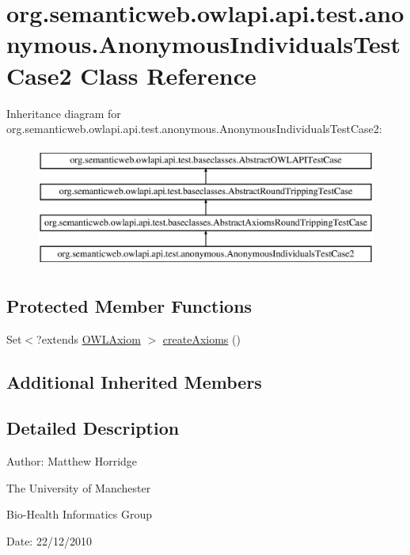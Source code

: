 \hypertarget{classorg_1_1semanticweb_1_1owlapi_1_1api_1_1test_1_1anonymous_1_1_anonymous_individuals_test_case2}{\section{org.\-semanticweb.\-owlapi.\-api.\-test.\-anonymous.\-Anonymous\-Individuals\-Test\-Case2 Class Reference}
\label{classorg_1_1semanticweb_1_1owlapi_1_1api_1_1test_1_1anonymous_1_1_anonymous_individuals_test_case2}
}
Inheritance diagram for org.\-semanticweb.\-owlapi.\-api.\-test.\-anonymous.\-Anonymous\-Individuals\-Test\-Case2\-:\begin{figure}[H]
\begin{center}
\leavevmode
\includegraphics[height=4.000000cm]{classorg_1_1semanticweb_1_1owlapi_1_1api_1_1test_1_1anonymous_1_1_anonymous_individuals_test_case2}
\end{center}
\end{figure}
\subsection*{Protected Member Functions}
\begin{DoxyCompactItemize}
\item 
Set$<$?extends \hyperlink{interfaceorg_1_1semanticweb_1_1owlapi_1_1model_1_1_o_w_l_axiom}{O\-W\-L\-Axiom} $>$ \hyperlink{classorg_1_1semanticweb_1_1owlapi_1_1api_1_1test_1_1anonymous_1_1_anonymous_individuals_test_case2_a0d2fd4f6cbedfa36d5bf468592c32bcd}{create\-Axioms} ()
\end{DoxyCompactItemize}
\subsection*{Additional Inherited Members}


\subsection{Detailed Description}
Author\-: Matthew Horridge\par
 The University of Manchester\par
 Bio-\/\-Health Informatics Group\par
 Date\-: 22/12/2010 


